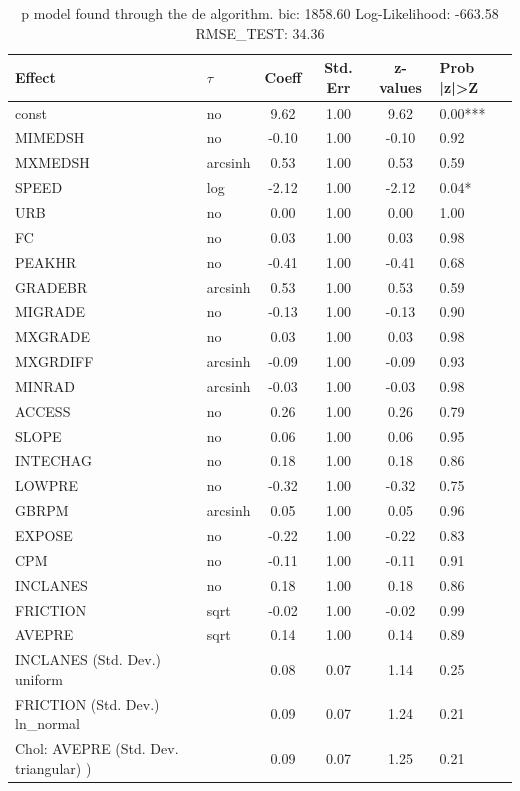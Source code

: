\begin{table}
	\caption{p model found through the de algorithm. bic: 1858.60 Log-Likelihood: -663.58 RMSE_TEST: 34.36}
	\begin{center}
		\begin{tabular}{|l|l|c|c|c|l|}
			\hline
			Effect & $\tau$ & Coeff & Std. Err & z-values & Prob |z|>Z \\
			\hline
			const & no & 9.62 & 1.00 & 9.62 & 0.00*** \\
			\hline
			MIMEDSH & no & -0.10 & 1.00 & -0.10 & 0.92 \\
			\hline
			MXMEDSH & arcsinh & 0.53 & 1.00 & 0.53 & 0.59 \\
			\hline
			SPEED & log & -2.12 & 1.00 & -2.12 & 0.04* \\
			\hline
			URB & no & 0.00 & 1.00 & 0.00 & 1.00 \\
			\hline
			FC & no & 0.03 & 1.00 & 0.03 & 0.98 \\
			\hline
			PEAKHR & no & -0.41 & 1.00 & -0.41 & 0.68 \\
			\hline
			GRADEBR & arcsinh & 0.53 & 1.00 & 0.53 & 0.59 \\
			\hline
			MIGRADE & no & -0.13 & 1.00 & -0.13 & 0.90 \\
			\hline
			MXGRADE & no & 0.03 & 1.00 & 0.03 & 0.98 \\
			\hline
			MXGRDIFF & arcsinh & -0.09 & 1.00 & -0.09 & 0.93 \\
			\hline
			MINRAD & arcsinh & -0.03 & 1.00 & -0.03 & 0.98 \\
			\hline
			ACCESS & no & 0.26 & 1.00 & 0.26 & 0.79 \\
			\hline
			SLOPE & no & 0.06 & 1.00 & 0.06 & 0.95 \\
			\hline
			INTECHAG & no & 0.18 & 1.00 & 0.18 & 0.86 \\
			\hline
			LOWPRE & no & -0.32 & 1.00 & -0.32 & 0.75 \\
			\hline
			GBRPM & arcsinh & 0.05 & 1.00 & 0.05 & 0.96 \\
			\hline
			EXPOSE & no & -0.22 & 1.00 & -0.22 & 0.83 \\
			\hline
			CPM & no & -0.11 & 1.00 & -0.11 & 0.91 \\
			\hline
			INCLANES & no & 0.18 & 1.00 & 0.18 & 0.86 \\
			\hline
			FRICTION & sqrt & -0.02 & 1.00 & -0.02 & 0.99 \\
			\hline
			AVEPRE & sqrt & 0.14 & 1.00 & 0.14 & 0.89 \\
			\hline
			INCLANES (Std. Dev.) uniform &  & 0.08 & 0.07 & 1.14 & 0.25 \\
			\hline
			FRICTION (Std. Dev.) ln_normal &  & 0.09 & 0.07 & 1.24 & 0.21 \\
			\hline
			 Chol: AVEPRE (Std. Dev. triangular) ) &  & 0.09 & 0.07 & 1.25 & 0.21 \\
			\hline
		\end{tabular}
	\end{center}
\end{table}